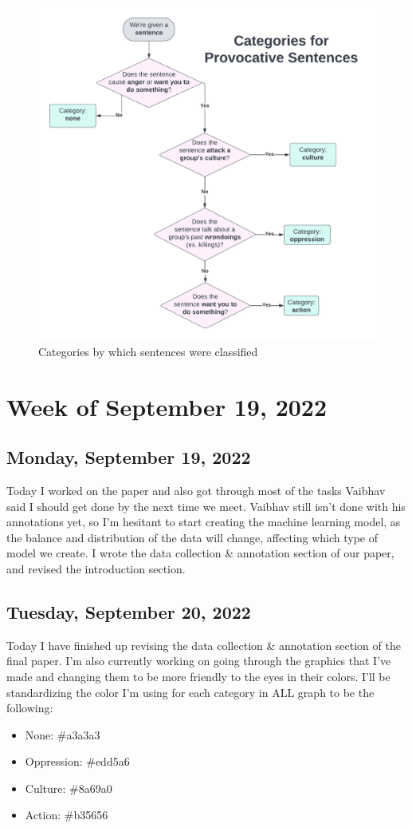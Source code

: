 \documentclass[11pt,letterpaper]{article}
\begin{document}
\begin{figure}
    \centering
    \includegraphics[scale=0.4]{images/categories.png}
    \caption{Categories by which sentences were classified}
    \label{fig:categories}
\end{figure}

\section{Week of September 19, 2022}

\subsection{Monday, September 19, 2022}
Today I worked on the paper and also got through most of the tasks Vaibhav said I should get done by the next time we meet. Vaibhav still isn't done with his annotations yet, so I'm hesitant to start creating the machine learning model, as the balance and distribution of the data will change, affecting which type of model we create. I wrote the data collection & annotation section of our paper, and revised the introduction section.

\subsection{Tuesday, September 20, 2022}
Today I have finished up revising the data collection & annotation section of the final paper. I'm also currently working on going through the graphics that I've made and changing them to be more friendly to the eyes in their colors. I'll be standardizing the color I'm using for each category in ALL graph to be the following:
\begin{itemize}
    \item None: \#a3a3a3
    \item Oppression: \#edd5a6
    \item Culture: \#8a69a0
    \item Action: \#b35656
\end{itemize}
\end{document}
